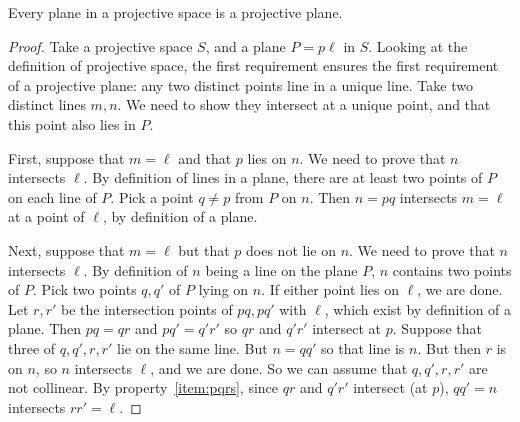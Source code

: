 \begin{lemma}
Every plane in a projective space is a projective plane.
\end{lemma}
\begin{proof}
Take a projective space \(S\), and a plane \(P=p\ell\) in \(S\).
Looking at the definition of projective space, the first requirement ensures the first requirement of a projective plane: any two distinct points line in a unique line.
Take two distinct lines \(m, n\).
We need to show they intersect at a unique point, and that this point also lies in \(P\).

First, suppose that \(m=\ell\) and that \(p\) lies on \(n\).
We need to prove that \(n\) intersects \(\ell\).
By definition of lines in a plane, there are at least two points of \(P\) on each line of \(P\). 
Pick a point \(q \ne p\) from \(P\) on \(n\).
Then \(n=pq\) intersects \(m=\ell\) at a point of \(\ell\), by definition of a plane.

Next, suppose that \(m=\ell\) but that \(p\) does not lie on \(n\).
We need to prove that \(n\) intersects \(\ell\).
By definition of \(n\) being a line on the plane \(P\), \(n\) contains two points of \(P\).
Pick two points \(q, q'\) of \(P\) lying on \(n\).
If either point lies on \(\ell\), we are done.
Let \(r, r'\) be the intersection points of \(pq, pq'\) with \(\ell\), which exist by definition of a plane.
Then \(pq=qr\) and \(pq'=q'r'\) so \(qr\) and \(q'r'\) intersect at \(p\).
Suppose that three of \(q, q', r, r'\) lie on the same line.
But \(n=qq'\) so that line is \(n\).
But then \(r\) is on \(n\), so \(n\) intersects \(\ell\), and we are done.
So we can assume that \(q, q', r, r'\) are not collinear.
By property~\vref{item:pqrs}, since \(qr\) and \(q'r'\) intersect (at \(p\)), \(qq'=n\) intersects \(rr'=\ell\).


\end{proof}
